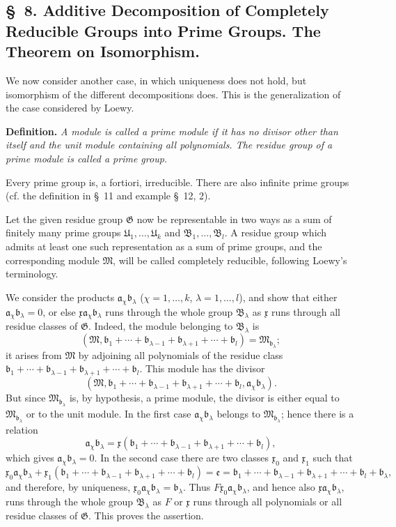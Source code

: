 \documentclass[11pt]{article}
\newcommand{\mM}{\mathfrak{M}}
\newcommand{\mG}{\mathfrak{G}}
\newcommand{\mB}{\mathfrak{B}}
\newcommand{\ma}{\mathfrak{a}}
\newcommand{\mb}{\mathfrak{b}}
\newcommand{\mx}{\mathfrak{x}}
\newcommand{\me}{\mathfrak{e}}
\newcommand{\mU}{\mathfrak{U}}
\begin{document}
\subsection*{\S~8. Additive Decomposition of Completely Reducible Groups into Prime Groups. The Theorem on Isomorphism.}

We now consider another case, in which uniqueness does not hold, but isomorphism of the different decompositions does. This is the generalization of the case considered by Loewy.

\textbf{Definition.} \emph{A module is called a prime module if it has no divisor other than itself and the unit module containing all polynomials. The residue group of a prime module is called a prime group.}

Every prime group is, a fortiori, irreducible. There are also infinite prime groups (cf. the definition in \S~11 and example \S~12, 2).

Let the given residue group $\mG$ now be representable in two ways as a sum of finitely many prime groups $\mU_1,
\ldots,\mU_k$ and $\mB_1,
\ldots,\mB_l$. A residue group which admits at least one such representation as a sum of prime groups, and the corresponding module $\mM$, will be called completely reducible, following Loewy's terminology.

We consider the products $\ma_\chi\mb_\lambda$ ($\chi=1,
\ldots,k$, $\lambda=1,
\ldots,l$), and show that either $\ma_\chi\mb_\lambda=0$, or else $\mx\ma_\chi\mb_\lambda$ runs through the whole group $\mB_\lambda$ as $\mx$ runs through all residue classes of $\mG$. Indeed, the module belonging to $\mB_\lambda$ is
\[
 (\mM,\mb_1+\cdots+\mb_{\lambda-1}+\mb_{\lambda+1}+\cdots+\mb_l)=\mM_{\mb_\lambda};
\]
it arises from $\mM$ by adjoining all polynomials of the residue class $\mb_1+
\cdots+\mb_{\lambda-1}+\mb_{\lambda+1}+\cdots+\mb_l$. This module has the divisor
\[
 (\mM,\mb_1+\cdots+\mb_{\lambda-1}+\mb_{\lambda+1}+\cdots+\mb_l,
 \ma_\chi\mb_\lambda).
\]
But since $\mM_{\mb_\lambda}$ is, by hypothesis, a prime module, the divisor is either equal to $\mM_{\mb_\lambda}$ or to the unit module. In the first case $\ma_\chi\mb_\lambda$ belongs to $\mM_{\mb_\lambda}$; hence there is a relation
\[
 \ma_\chi\mb_\lambda=\mx(\mb_1+
\cdots+\mb_{\lambda-1}+\mb_{\lambda+1}+\cdots+\mb_l),
\]
which gives $\ma_\chi\mb_\lambda=0$. In the second case there are two classes $\mx_0$ and $\mx_1$ such that
\[
 \mx_0\ma_\chi\mb_\lambda
 +\mx_1(\mb_1+\cdots+\mb_{\lambda-1}+\mb_{\lambda+1}+\cdots+\mb_l)
 =\me=\mb_1+\cdots+\mb_{\lambda-1}+\mb_{\lambda+1}+\cdots+\mb_l+\mb_\lambda,
\]
and therefore, by uniqueness, $\mx_0\ma_\chi\mb_\lambda=\mb_\lambda$. Thus $F\mx_0\ma_\chi\mb_\lambda$, and hence also $\mx\ma_\chi\mb_\lambda$, runs through the whole group $\mB_\lambda$ as $F$ or $\mx$ runs through all polynomials or all residue classes of $\mG$. This proves the assertion.
\end{document}
